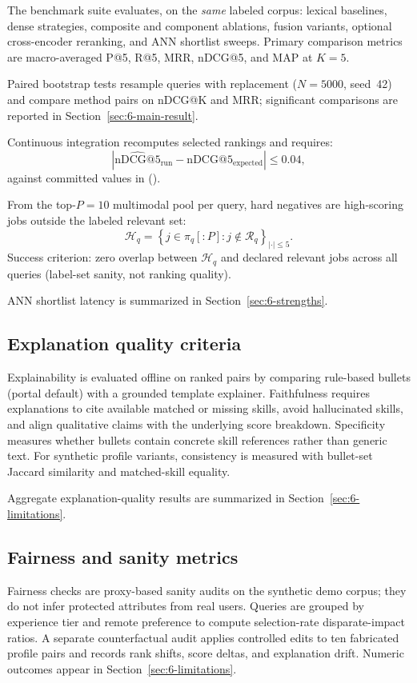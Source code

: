 The benchmark suite evaluates, on the \emph{same} labeled corpus: lexical baselines, dense strategies, composite and component ablations, fusion variants, optional cross-encoder reranking, and ANN shortlist sweeps.
Primary comparison metrics are macro-averaged P@5, R@5, MRR, nDCG@5, and MAP at $K{=}5$.

Paired bootstrap tests resample queries with replacement ($N{=}5000$, seed~42) and compare method pairs on nDCG@K and MRR; significant comparisons are reported in Section~\ref{sec:6-main-result}.

Continuous integration recomputes selected rankings and requires:
\begin{equation}
  \left| \widehat{\mathrm{nDCG@}5}_{\mathrm{run}} - \mathrm{nDCG@}5_{\mathrm{expected}} \right| \leq 0.04,
  \label{eq:regression}
\end{equation}
against committed values in  ().

From the top-$P{=}10$ multimodal pool per query, hard negatives are high-scoring jobs outside the labeled relevant set:
\begin{equation}
  \mathcal{H}_q = \left\{ j \in \pi_q[:P] : j \notin \mathcal{R}_q \right\}_{|\cdot|\leq 5}.
  \label{eq:hard-negs}
\end{equation}
Success criterion: zero overlap between $\mathcal{H}_q$ and declared relevant jobs across all queries (label-set sanity, not ranking quality).

ANN shortlist latency is summarized in Section~\ref{sec:6-strengths}.

\subsection{Explanation quality criteria}\label{sec:5-explainability}

Explainability is evaluated offline on ranked pairs by comparing rule-based bullets (portal default) with a grounded template explainer.
Faithfulness requires explanations to cite available matched or missing skills, avoid hallucinated skills, and align qualitative claims with the underlying score breakdown.
Specificity measures whether bullets contain concrete skill references rather than generic text.
For synthetic profile variants, consistency is measured with bullet-set Jaccard similarity and matched-skill equality.

Aggregate explanation-quality results are summarized in Section~\ref{sec:6-limitations}.

\subsection{Fairness and sanity metrics}\label{sec:5-fairness}

Fairness checks are proxy-based sanity audits on the synthetic demo corpus; they do not infer protected attributes from real users.
Queries are grouped by experience tier and remote preference to compute selection-rate disparate-impact ratios.
A separate counterfactual audit applies controlled edits to ten fabricated profile pairs and records rank shifts, score deltas, and explanation drift.
Numeric outcomes appear in Section~\ref{sec:6-limitations}.

